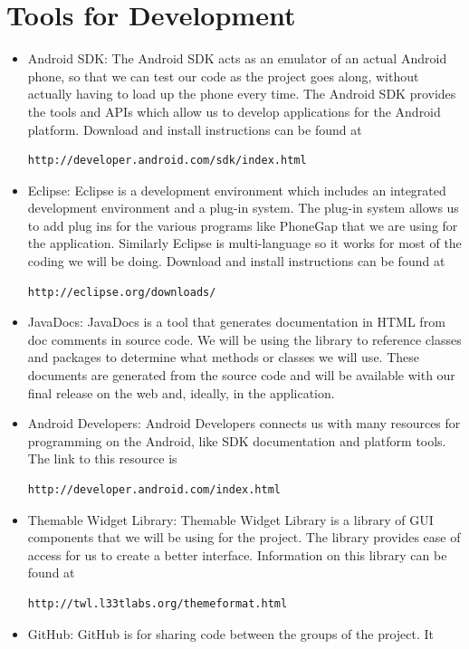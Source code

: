\documentclass[12pt]{article}
\begin{document}
\section{Tools for Development}
\begin{itemize}
\item Android SDK: The Android SDK acts as an emulator of an actual Android
phone, so that we can test our code as the project goes along, without
actually having to load up the phone every time. The Android SDK provides
the tools and APIs which allow us to develop applications for the Android
platform.  Download and install instructions can be found at 
\begin{verbatim}http://developer.android.com/sdk/index.html \end{verbatim}
\item Eclipse: Eclipse is a development environment which includes an integrated
development environment and a plug-in system. The plug-in system allows
us to add plug ins for the various programs like PhoneGap that we are using
for the application. Similarly Eclipse is multi-language so it works for most
of the coding we will be doing.  Download and install instructions can be found at 
\begin{verbatim}http://eclipse.org/downloads/ \end{verbatim}
\item JavaDocs: JavaDocs is a tool that generates documentation in HTML from
doc comments in source code. We will be using the library to reference
classes and packages to determine what methods or classes we will use.  These documents 
are generated from the source code and will be available with our final release on the 
web and, ideally, in the application.
\item Android Developers: Android Developers connects us with many resources
for programming on the Android, like SDK documentation and platform tools.  The link to 
this resource is
\begin{verbatim}
http://developer.android.com/index.html
\end{verbatim}
\item Themable Widget Library: Themable Widget Library is a library of GUI
components that we will be using for the project.  The library provides 
ease of access for us to create a better interface.  
Information on this library can be found at 
\begin{verbatim}
http://twl.l33tlabs.org/themeformat.html
\end{verbatim}
\item GitHub: GitHub is for sharing code between the groups of the project. It

\end{itemize}
\end{document}
